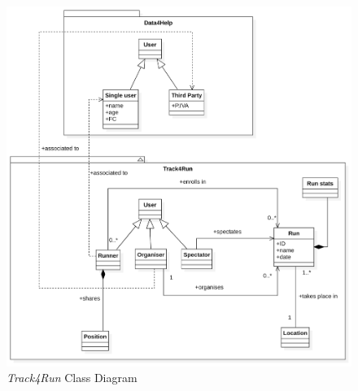 \documentclass[titlepage]{article}
\begin{document}
		\begin{figure}[H]
			\center
  			\includegraphics[width=\textwidth]{Diagrammi/T4RClass.png}
  			\caption{{\it Track4Run} Class Diagram}
 			\label{fig:T4RClass}
		\end{figure}
		
\end{document}
